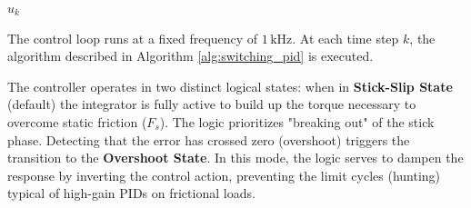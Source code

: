 \begin{algorithm}[H]
\begin{algorithmic}[1]

        \vspace{0.1cm}


        \vspace{0.1cm}

        \State \Return $u_k$
    \end{algorithmic}
\end{algorithm}

The control loop runs at a fixed frequency of $1\,\text{kHz}$. At each time step $k$, the algorithm described
in Algorithm \ref{alg:switching_pid} is executed.

The controller operates in two distinct logical states: when in \textbf{Stick-Slip State} (default) the
integrator is fully active to build up the torque necessary to overcome static friction ($F_s$). The logic
prioritizes "breaking out" of the stick phase. Detecting that the error has crossed zero (overshoot) triggers
the transition to the \textbf{Overshoot State}. In this mode, the logic serves to dampen the response by
inverting the control action, preventing the limit cycles (hunting) typical of high-gain PIDs on frictional loads.

